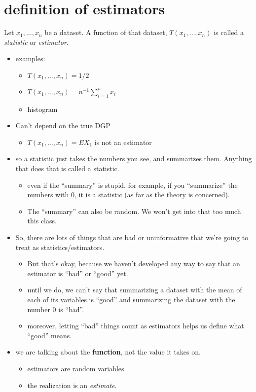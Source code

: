 \section{definition of estimators}
\label{sec-2}

    Let $x_1,\dots,x_n$ be a dataset.  A function of that dataset,
    $T(x_1,\dots,x_n)$ is called a \emph{statistic} or \emph{estimator}.
\begin{itemize}
\item examples:
\begin{itemize}
\item $T(x_1,\dots,x_n) = 1/2$
\item $T(x_1,\dots,x_n) = n^{-1} \sum_{i=1}^n x_i$
\item histogram
\end{itemize}
\item Can't depend on the true DGP
\begin{itemize}
\item $T(x_1,\dots,x_n) = E X_1$ is not an estimator
\end{itemize}
\item so a statistic just takes the numbers you see, and summarizes
      them.  Anything that does that is called a statistic.
\begin{itemize}
\item even if the ``summary'' is stupid.  for example, if you
        ``summarize'' the numbers with 0, it is a statistic (as far as the
        theory is concerned).
\item The ``summary'' can also be random.  We won't get into that too
        much this class.
\end{itemize}
\item So, there are lots of things that are bad or uninformative that
      we're going to treat as statistics/estimators.
\begin{itemize}
\item But that's okay, because we haven't developed any way to say
        that an estimator is ``bad'' or ``good'' yet.
\item until we do, we can't say that summarizing a dataset with the
        mean of each of its variables is ``good'' and summarizing the
        dataset with the number 0 is ``bad''.
\item moreover, letting ``bad'' things count as estimators helps us
        define what ``good'' means.
\end{itemize}
\item we are talking about the \textbf{function}, not the value it takes on.
\begin{itemize}
\item estimators are random variables
\item the realization is an \emph{estimate}.
\end{itemize}
\end{itemize}